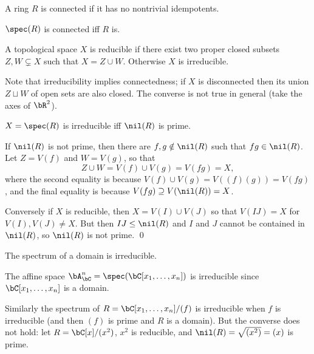 \eproof

\bdefn

    A ring $R$ is {\emphcolor connected} if it has no nontrivial idempotents.

\edefn

\bcoro

    $\spec(R)$ is connected iff $R$ is.

\ecoro

\bdefn

    A topological space $X$ is {\emphcolor reducible} if there exist two proper closed subsets $Z,W\subsetneq X$ such that $X=Z\cup W$.
    Otherwise $X$ is {\emphcolor irreducible}.

\edefn

Note that irreducibility implies connectedness; if $X$ is disconnected then its union $Z\sqcup W$ of open sets are also closed.
The converse is not true in general (take the axes of $\bR^2$).

\bprop

    $X=\spec(R)$ is irreducible iff $\nil(R)$ is prime.

\eprop

\bproof

    If $\nil(R)$ is not prime, then there are $f,g\notin\nil(R)$ such that $fg\in\nil(R)$.
    Let $Z=V(f)$ and $W=V(g)$, so that
    $$ Z \cup W = V(f) \cup V(g) = V(fg) = X , $$
    where the second equality is because $V(f)\cup V(g)=V((f)(g))=V(fg)$, and the final equality is because $V(fg)\supseteq V(\nil(R))=X$.

    Conversely if $X$ is reducible, then $X=V(I)\cup V(J)$ so that $V(IJ)=X$ for $V(I),V(J)\neq X$.
    But then $IJ\leq\nil(R)$ and $I$ and $J$ cannot be contained in $\nil(R)$, so $\nil(R)$ is not prime.
    \qed

\eproof

\bcoro

    The spectrum of a domain is irreducible.

\ecoro

\bexam

    The affine space $\bA^n_\bC=\spec(\bC[x_1,\dots,x_n])$ is irreducible since $\bC[x_1,\dots,x_n]$ is a domain.

    Similarly the spectrum of $R=\bC[x_1,\dots,x_n]/(f)$ is irreducible when $f$ is irreducible (and then $(f)$ is prime and $R$ is a domain).
    But the converse does not hold: let $R=\bC[x]/(x^2)$, $x^2$ is reducible, and $\nil(R)=\sqrt{(x^2)}=(x)$ is prime.

\eexam

